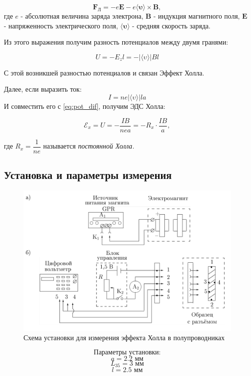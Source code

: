 \documentclass[a4paper, 12pt]{article}
\begin{document}
$$\boldsymbol{F_\text{Л}}  = -e \boldsymbol{E} - e \langle \boldsymbol{\upsilon} \rangle \times \boldsymbol{B},$$
где $e$ - абсолютная величина заряда электрона, $\boldsymbol{B}$ - индукция магнитного поля, $\boldsymbol{E}$ - напряженность электрического поля, $ \langle \boldsymbol{\upsilon} \rangle$ - средняя скорость заряда.

Из этого выражения получим разность потенциалов между двумя гранями:

\begin{equation}
U = -E_zl = - | \langle \upsilon \rangle | B l
\label{eq:pot_dif}
\end{equation}

С этой возникшей разностью потенциалов и связан Эффект Холла.

Далее, если выразить ток:
$$ I = ne |\langle \upsilon \rangle |  l a$$
И совместить его с \ref{eq:pot_dif}, получим ЭДС Холла:

\begin{equation}
\mathscr{E}_x = U = - \dfrac{IB}{nea} = -R_x \cdot \dfrac{IB}{a},
\label{eq: Hall}
\end{equation}

где $R_x = \dfrac{1}{ne}$ называется \textit{постоянной Холла.}

\subsection*{Установка и параметры измерения}

\begin{figure}
\includegraphics[width = 0.7 \textwidth]{Scheme1.png}
			\caption{Схема установки для измерения эффекта Холла в полупроводниках}
\end{figure} 

$$\text{Параметры установки:}$$
$$a = 2.2 \text{ мм}$$
$$L_{35} = 3 \text{ мм}$$
$$l = 2.5 \text{ мм}$$
\vspace{5.7 cm}
\end{document}
